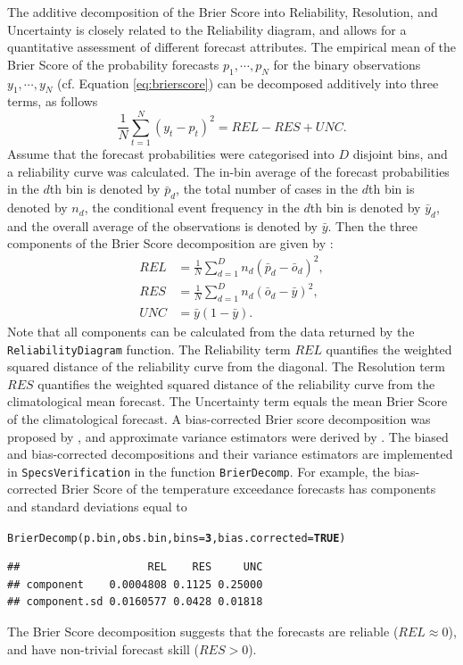 \documentclass[10pt]{article}\usepackage[]{graphicx}\usepackage[]{color}
\makeatletter
\newcommand{\hlnum}[1]{\textcolor[rgb]{0.502,0,0.502}{\textbf{#1}}}%
\newcommand{\hlstd}[1]{\textcolor[rgb]{0,0,0}{#1}}%
\newcommand{\hlkwc}[1]{\textcolor[rgb]{0,0.502,0.753}{#1}}%
\newcommand{\hlkwd}[1]{\textcolor[rgb]{0,0.267,0.4}{#1}}%
\newenvironment{kframe}{%
 \def\at@end@of@kframe{}%
 \ifinner\ifhmode%
  \def\at@end@of@kframe{\end{minipage}}%
  \begin{minipage}{\columnwidth}%
 \fi\fi%
 \def\FrameCommand##1{\hskip\@totalleftmargin \hskip-\fboxsep
 \colorbox{shadecolor}{##1}\hskip-\fboxsep
     \hskip-\linewidth \hskip-\@totalleftmargin \hskip\columnwidth}%
 \MakeFramed {\advance\hsize-\width
   \@totalleftmargin\z@ \linewidth\hsize
   \@setminipage}}%
 {\par\unskip\endMakeFramed%
 \at@end@of@kframe}
\newenvironment{knitrout}{}{} %
\newcommand{\pkg}[1]{\texttt{#1}}
\newcommand{\code}[1]{\texttt{#1}}
\makeatother
\begin{document}
The additive decomposition of the Brier Score into Reliability, Resolution, and Uncertainty is closely related to the Reliability diagram, and allows for a quantitative assessment of different forecast attributes.
The empirical mean of the Brier Score of the probability forecasts $p_1, \cdots, p_N$ for the binary observations $y_1, \cdots, y_N$ (cf. Equation \ref{eq:brierscore}) can be decomposed additively into three terms, as follows
%
\begin{equation}
\frac{1}{N}\sum_{t=1}^N (y_t - p_t)^2 = REL - RES + UNC.
\end{equation}
%
Assume that the forecast probabilities were categorised into $D$ disjoint bins, and a reliability curve was calculated.
The in-bin average of the forecast probabilities in the $d$th bin is denoted by $\bar{p}_d$, the total number of cases in the $d$th bin is denoted by $n_d$, the conditional event frequency in the $d$th bin is denoted by $\bar{y}_d$, and the overall average of the observations is denoted by $\bar{y}$.
Then the three components of the Brier Score decomposition are given by \citep{murphy1973new}:
%
\begin{align}
REL & = \frac{1}{N}\sum_{d=1}^D n_d (\bar{p}_d - \bar{o}_d)^2,\\
RES & = \frac{1}{N}\sum_{d=1}^D n_d (\bar{o}_d - \bar{y})^2,\\
UNC & = \bar{y}(1-\bar{y}).
\end{align}
%
Note that all components can be calculated from the data returned by the \code{ReliabilityDiagram} function.
The Reliability term $REL$ quantifies the weighted squared distance of the reliability curve from the diagonal.
The Resolution term $RES$ quantifies the weighted squared distance of the reliability curve from the climatological mean forecast.
The Uncertainty term equals the mean Brier Score of the climatological forecast.
A bias-corrected Brier score decomposition was proposed by \citet{ferro2012bias}, and approximate variance estimators were derived by \citet{siegert2013variance}.
The biased and bias-corrected decompositions and their variance estimators are implemented in \pkg{SpecsVerification} in the function \code{BrierDecomp}.
For example, the bias-corrected Brier Score of the temperature exceedance forecasts has components and standard deviations equal to
%
\begin{knitrout}
\color{fgcolor}\begin{kframe}
\begin{alltt}
\hlkwd{BrierDecomp}\hlstd{(p.bin, obs.bin,} \hlkwc{bins}\hlstd{=}\hlnum{3}\hlstd{,} \hlkwc{bias.corrected}\hlstd{=}\hlnum{TRUE}\hlstd{)}
\end{alltt}
\begin{verbatim}
##                    REL    RES     UNC
## component    0.0004808 0.1125 0.25000
## component.sd 0.0160577 0.0428 0.01818
\end{verbatim}
\end{kframe}
\end{knitrout}
%
The Brier Score decomposition suggests that the forecasts are reliable ($REL\approx 0$), and have non-trivial forecast skill ($RES > 0$). 
\end{document}
